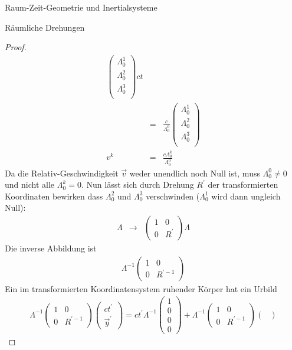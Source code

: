 \begin{chapter}{\titlestr}
\begin{section}{Raum-Zeit-Geometrie und Inertialsysteme}
\begin{subsection}{Räumliche Drehungen}
\begin{proof}
\begin{eqnarray*}
\begin{pmatrix}
\Lambda^1_0\\
\Lambda^2_0\\
\Lambda^3_0\\
\end{pmatrix}ct\\
&=& \frac{c}{\Lambda^0_0}\begin{pmatrix}
\Lambda^1_0\\
\Lambda^2_0\\
\Lambda^3_0\\
\end{pmatrix}\\
v^k &=& \frac{c\Lambda^k_0}{\Lambda^0_0}
\end{eqnarray*}
Da die Relativ-Geschwindigkeit $\vec{v}$ weder unendlich noch Null ist, muss $\Lambda^0_0\ne 0$ und nicht alle $\Lambda^k_0=0$.
Nun lässt sich durch Drehung $R^\prime$ der transformierten Koordinaten bewirken dass $\Lambda^2_0$ und $\Lambda^3_0$ verschwinden
($\Lambda^1_0$ wird dann ungleich Null):
\begin{eqnarray*}
\Lambda &\rightarrow&
\begin{pmatrix}
1 & 0\\
0 & R^\prime
\end{pmatrix}\Lambda
\end{eqnarray*}
Die inverse Abbildung ist
\begin{eqnarray*}
\Lambda^{-1}
\begin{pmatrix}
1 & 0\\
0 & R^{\prime-1}
\end{pmatrix}
\end{eqnarray*}
Ein im transformierten Koordinatensystem ruhender Körper hat ein Urbild
\begin{eqnarray*}
\Lambda^{-1}
\begin{pmatrix}
1 & 0\\
0 & R^{\prime-1}
\end{pmatrix}
\begin{pmatrix}
ct^\prime\\
\vec{y}^{\prime}
\end{pmatrix}
=ct^\prime\Lambda^{-1}
\begin{pmatrix}
1\\
0\\
0\\
0
\end{pmatrix}
+\Lambda^{-1}
\begin{pmatrix}
1 & 0\\
0 & R^{\prime-1}
\end{pmatrix}
\begin{pmatrix}

\end{pmatrix}
\end{eqnarray*}
\end{proof}
\end{subsection}
\end{section}
\end{chapter}
